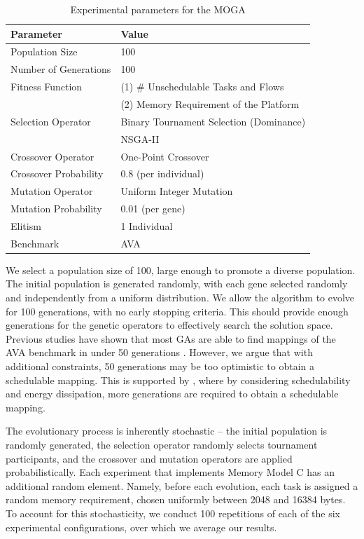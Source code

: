 \documentclass[10pt,conference]{IEEEtran}
\begin{document}
\begin{table}[!ht]
  \label{tab:moga-config}
  \centering
  \caption{Experimental parameters for the MOGA}
  \footnotesize
  \begin{tabularx}{0.48\textwidth}{lX}
    \toprule
    Parameter & Value \\
    \midrule
    Population Size & 100 \\
    Number of Generations & 100 \\
    Fitness Function & (1) \# Unschedulable Tasks and Flows \\
    & (2) Memory Requirement of the Platform \\
    Selection Operator & Binary Tournament Selection (Dominance) \\
    & NSGA-II \\
    Crossover Operator & One-Point Crossover \\
    Crossover Probability & 0.8 (per individual) \\
    Mutation Operator & Uniform Integer Mutation \\
    Mutation Probability & 0.01 (per gene) \\
    Elitism & 1 Individual \\
    Benchmark & AVA \\
    \bottomrule
  \end{tabularx}
\end{table}

We select a population size of 100, large enough to promote a diverse population. The initial population is generated randomly, with each gene selected randomly and independently from a uniform distribution. We allow the algorithm to evolve for 100 generations, with no early stopping criteria. This should provide enough generations for the genetic operators to effectively search the solution space. Previous studies have shown that most GAs are able to find mappings of the AVA benchmark in under 50 generations \cite{Indrusiak14}. However, we argue that with additional constraints, 50 generations may be too optimistic to obtain a schedulable mapping. This is supported by \cite{Sayuti13}, where by considering schedulability and energy dissipation, more generations are required to obtain a schedulable mapping.

The evolutionary process is inherently stochastic -- the initial population is randomly generated, the selection operator randomly selects tournament participants, and the crossover and mutation operators are applied probabilistically. Each experiment that implements Memory Model C has an additional random element. Namely, before each evolution, each task is assigned a random memory requirement, chosen uniformly between 2048 and 16384 bytes. To account for this stochasticity, we conduct 100 repetitions of each of the six experimental configurations, over which we average our results.
\end{document}
